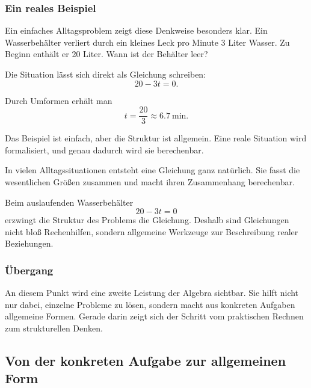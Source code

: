 \medskip

\subsubsection*{Ein reales Beispiel}
Ein einfaches Alltagsproblem zeigt diese Denkweise besonders klar.
Ein Wasserbehälter verliert durch ein kleines Leck pro Minute
3 Liter Wasser.
Zu Beginn enthält er 20 Liter.
Wann ist der Behälter leer?

Die Situation lässt sich direkt als Gleichung schreiben:
\[
20 - 3t = 0.
\]

Durch Umformen erhält man
\[
t = \frac{20}{3} \approx \SI{6.7}{\minute}.
\]

Das Beispiel ist einfach,
aber die Struktur ist allgemein.
Eine reale Situation wird formalisiert,
und genau dadurch wird sie berechenbar.

\begin{DidacticBox}
	\label{box:realitaet}
	In vielen Alltagssituationen entsteht eine Gleichung ganz natürlich.
	Sie fasst die wesentlichen Größen zusammen
	und macht ihren Zusammenhang berechenbar.
	
	Beim auslaufenden Wasserbehälter
	\[
	20 - 3t = 0
	\]
	erzwingt die Struktur des Problems die Gleichung.
	Deshalb sind Gleichungen nicht bloß Rechenhilfen,
	sondern allgemeine Werkzeuge zur Beschreibung realer Beziehungen.
\end{DidacticBox}

\subsubsection*{Übergang}
An diesem Punkt wird eine zweite Leistung der Algebra sichtbar.
Sie hilft nicht nur dabei, einzelne Probleme zu lösen,
sondern macht aus konkreten Aufgaben allgemeine Formen.
Gerade darin zeigt sich der Schritt
vom praktischen Rechnen zum strukturellen Denken.


\subsection{Von der konkreten Aufgabe zur allgemeinen Form}
\label{sec:3.4_allgemeine_form}

